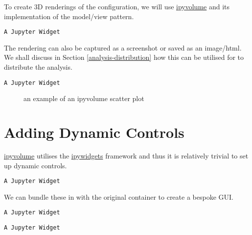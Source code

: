 \documentclass[10pt,parskip=half,
	toc=sectionentrywithdots,
	bibliography=totocnumbered,
	captions=tableheading,numbers=noendperiod]{scrartcl}
\begin{document}
To create 3D renderings of the configuration, we will use
\href{http://ipyvolume.readthedocs.io}{ipyvolume} and its implementation
of the model/view pattern.

\begin{lstlisting}[language={},postbreak={},numbers=none,xrightmargin=7pt,breakindent=0pt,aboveskip=5pt,belowskip=5pt]
A Jupyter Widget
\end{lstlisting}

The rendering can also be captured as a screenshot or saved as an
image/html. We shall discuss in Section \ref{analysis-distribution} how
this can be utilised for to distribute the analysis.

\begin{lstlisting}[language={},postbreak={},numbers=none,xrightmargin=7pt,breakindent=0pt,aboveskip=5pt,belowskip=5pt]
A Jupyter Widget
\end{lstlisting}

\begin{figure}[H]\begin{center}\end{center}\caption{an example of an ipyvolume scatter plot}\label{fig:ipyvol1}
    \end{figure}

\section{Adding Dynamic Controls}\label{adding-dynamic-controls}

\href{http://ipyvolume.readthedocs.io}{ipyvolume} utilises the
\href{http://ipywidgets.readthedocs.io}{ipywidgets} framework and thus
it is relatively trivial to set up dynamic controls.

\begin{lstlisting}[language={},postbreak={},numbers=none,xrightmargin=7pt,breakindent=0pt,aboveskip=5pt,belowskip=5pt]
A Jupyter Widget
\end{lstlisting}

We can bundle these in with the original container to create a bespoke
GUI.

\begin{lstlisting}[language={},postbreak={},numbers=none,xrightmargin=7pt,breakindent=0pt,aboveskip=5pt,belowskip=5pt]
A Jupyter Widget
\end{lstlisting}

\begin{lstlisting}[language={},postbreak={},numbers=none,xrightmargin=7pt,breakindent=0pt,aboveskip=5pt,belowskip=5pt]
A Jupyter Widget
\end{lstlisting}
\end{document}
